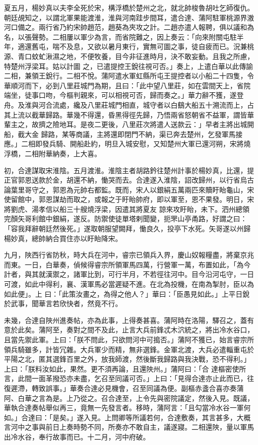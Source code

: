 \begin{pinyinscope}
 夏五月，楊妙真以夫李全死於宋，構浮橋於楚州之北，就北帥梭魯胡吐乞師復仇。朝廷覘知之，以謂北軍果能渡淮，淮與河南跬步間耳，遣合達、蒲阿駐軍桃源界滶河口備之。兩行省乃約宋帥趙范，趙葵為夾攻之計。二趙亦遣人報聘，俱以議和為名，以張聲勢。二相屢以軍少為言，而省院難之，因上奏云：「向來附關屯駐半年，適還舊屯，喘不及息，又欲以暑月東行，實無可圖之事，徒自疲而已。況兼桃源、青口蚊虻湫濕之地，不便牧養，目今非征進時月，決不敢妄動。且我之所慮，特楚州浮梁耳。姑以計圖
 之，已遣提控王銳往視可否。」奏上，上遣白華以此傳諭二相，兼領王銳行。二相不悅。蒲阿遣水軍虹縣所屯王提控者以小船二十四隻，令華順河而下，必到八里莊城門為期，且曰：「此中望八里莊，如在雲間天上，省院端坐，徒事口吻，今樞判親來，可以相視可否，歸而奏之。」華力辭不獲，遂登舟。及淮與河合流處，纔及八里莊城門相直，城守者以白鷂大船五十溯流而上，占其上流以截華歸路。華幾不得還，昏黑得徑先歸，乃悟兩省怒朝省不益軍，謂皆華輩主之，故擠之險地耳。是夜二更後，八里莊次將遣人送款云：」早者主將出城開船，截大金
 歸路，某等商議，主將還即閉門不納，渠已奔去楚州，乞發軍馬接應。」二相即發兵騎、開船赴約，明旦入城安慰，又知楚州大軍已還河朔，宋將燒浮橋，二相附華納奏，上大喜。



 初，合達謀取宋淮陰。五月渡淮。淮陰主者胡路鈐往楚州計事於楊妙真，比還，提正官郭恩送款於金，胡還不納，慟哭而去。合達遂入淮陰，詔改歸州，以行省烏古論葉里哥守之，郭恩為元帥右都監。既而，宋人以銀絹五萬兩匹來贖盱眙龜山，宋使留館中，郭恩謀劫而取之，或報之于盱眙帥府，即以軍至，恩不果發。明日，宋將劉虎、湯孝信以船三十艘燒浮梁，因遣其將夏友
 諒來攻盱眙，未下。泗州總領完顏矢哥利館中銀絹，遂反。防禦使徒單塔剌聞變，扼罘山亭甬路，好謂之曰：「容我拜辭朝廷然後死。」遂取朝服望闕拜，慟良久，投亭下水死。矢哥遂以州歸楊妙真，總帥納合買住亦以盱眙降宋。



 九月，陜西行省防秋，時大兵在河中，睿宗已領兵入界，慶山奴報糧盡，將棄京兆而東。一日，白華奏，偵候得睿宗所領軍馬四萬，行營軍一萬，布置如此，「為今計者，與其就漢禦之，諸軍比到，可行半月，不若徑往河中。目今沿河屯守，一日可渡，如此中得利，襄、漢軍馬必當遲疑不進。在北為投機，在南為掣肘，臣以為如此便」。上
 曰：「此策汝畫之，為得之他人？」華曰：「臣愚見如此。」上平日銳於武事，聞華言若欣快者，然竟不行。



 未幾，合達自陜州進奏帖，亦為此事，上得奏甚喜。蒲阿時在洛陽，驛召之，蓋有意於此矣。蒲阿至，奏對之間不及此，止言大兵前鋒忒木泬統之，將出冷水谷口，且當先禦此軍。上曰：「朕不問此，只欲問河中可搗否。」蒲阿不獲已，始言睿宗所領兵騎雖多，計皆冗雜。大兵軍少而精，無非選鋒。金軍北渡，大兵必遣輜重屯於平陽之北，匿其選鋒百里之外，放我師渡，然後斷我歸路與我決戰，恐不得利。」上曰：「朕料汝如此，果然。更不須再論，且還陜州。」蒲阿曰：「合
 達樞密使所言，此間一面革撥恐亦未盡，乞召至同議可否。」上曰：「見得合達亦止此而已，往復遲滯，轉致誤事。」華奏合達必見機會，召至同議為便。副樞赤盞合喜亦奏蒲阿、白華之言為是。上乃從之。召合達至，上令先與密院議定，然後入見。既議，華執合達奏帖舉似再三，竟無一先發言者。移時，蒲阿言：「且勾當冷水谷一軍何如。」合達曰：「是矣。」遂入見。上問卿等所議若何，合達敷奏，其言甚多，大概言河中之事與前日上奏時勢不同，所奏亦不敢自主，議遂寢。二相還陜，量以軍馬出冷水谷，奉行故事而已。十二月，河中府破。




\end{pinyinscope}
